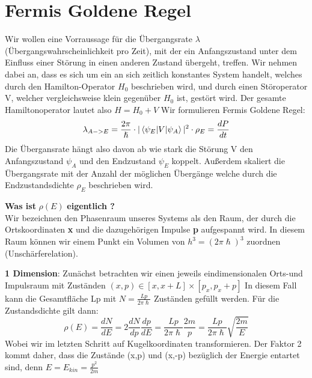 \documentclass[Ex4_Zusammenfassung.tex]{subfiles}
\begin{document}
\section{Fermis Goldene Regel}
Wir wollen eine Vorraussage für die Übergangsrate $ \lambda $ (Übergangswahrscheinlichkeit pro Zeit), mit der ein Anfangszustand unter dem Einfluss einer Störung in einen anderen Zustand übergeht, treffen. Wir nehmen dabei an, dass es sich um ein an sich zeitlich konstantes System handelt, welches durch den Hamilton-Operator $ H_0 $ beschrieben wird, und durch einen Störoperator V, welcher vergleichsweise klein gegenüber  $ H_0 $ ist, gestört wird. Der gesamte Hamiltonoperator lautet also $ H = H_0 + V $ \newline
Wir formulieren Fermis Goldene Regel: 
\begin{equation}
\lambda_{A->E} = \frac{2\pi}{\hslash} \cdot |\braket{\psi_{E} | V |\psi_{A}}|^2 \cdot \rho_{E} = \frac{dP}{dt}
\end{equation}
Die Übergansrate hängt also davon ab wie stark die Störung V den Anfangszustand $ \psi_A $ und den Endzustand $ \psi_E $ koppelt. Außerdem skaliert die Übergangsrate mit der Anzahl der möglichen Übergänge welche durch die Endzustandsdichte $ \rho_{E} $ beschrieben wird. \newpage 

\textbf{Was ist} $\rho(E)$ \textbf{eigentlich ?}
\ \\ \newline
Wir bezeichnen den Phasenraum unseres Systems als den Raum, der durch die Ortskoordinaten \textbf{x} und die dazugehörigen Impulse \textbf{p} aufgespannt wird. In diesem Raum können wir einem Punkt ein Volumen von $ h^3 = (2\pi \hslash)^3 $ zuordnen (Unschärferelation). \newline 

\textbf{1 Dimension}: \newline
Zunächst betrachten wir einen jeweils eindimensionalen Orts-und Impulsraum mit Zuständen $ (x,p) \in  [x,x+L] \times [p_{x},p_{x}+p] $ In diesem Fall kann die Gesamtfläche Lp mit $ N = \frac{Lp}{2\pi \hslash} $ Zuständen gefüllt werden. Für die Zustandsdichte gilt dann: 
\begin{equation}
 \rho(E) = \frac{dN}{dE} = 2 \frac{dN}{dp} \frac{dp}{dE} = \frac{Lp}{2\pi \hslash} \frac{2m}{p} =  \frac{Lp}{2\pi \hslash} \sqrt{\frac{2m}{E}} 
 \end{equation}
 Wobei wir im letzten Schritt auf Kugelkoordinaten transformieren. 
 Der Faktor 2 kommt daher, dass die Zustände (x,p) und (x,-p) bezüglich der Energie entartet sind, denn $ E = E_{kin} = \frac{p^2}{2m} $ \newline
 
\end{document}
